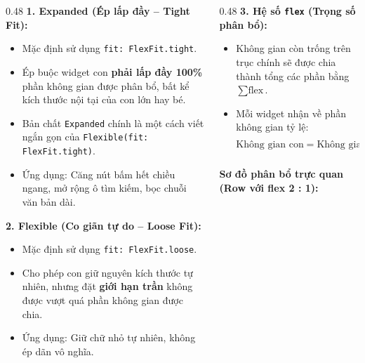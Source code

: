 \documentclass[aspectratio=169, 10pt]{beamer}
\newcommand{\SlideHeader}[2]{%
  \noindent{\textcolor{AccentOrange}{\textbf{\footnotesize #1}}}\\[0.08cm]
  \noindent{\Large \textbf{\textcolor{NavyTitle}{#2}}}\\[0.22cm]
}
\begin{document}
\begin{frame}
  \SlideHeader{CƠ SỞ LÝ THUYẾT}{Phân Tách Không Gian: Expanded vs Flexible}

  \begin{columns}[T]
    \begin{column}{0.48\textwidth}
      \textbf{1. Expanded (Ép lấp đầy -- Tight Fit):}
      \begin{itemize}
        \item Mặc định sử dụng \texttt{fit: FlexFit.tight}.
        \item Ép buộc widget con \textbf{phải lấp đầy 100\%} phần không gian được phân bổ, bất kể kích thước nội tại của con lớn hay bé.
        \item Bản chất \texttt{Expanded} chính là một cách viết ngắn gọn của \texttt{Flexible(fit: FlexFit.tight)}.
        \item Ứng dụng: Căng nút bấm hết chiều ngang, mở rộng ô tìm kiếm, bọc chuỗi văn bản dài.
      \end{itemize}

      \vspace{0.2cm}
      \textbf{2. Flexible (Co giãn tự do -- Loose Fit):}
      \begin{itemize}
        \item Mặc định sử dụng \texttt{fit: FlexFit.loose}.
        \item Cho phép con giữ nguyên kích thước tự nhiên, nhưng đặt \textbf{giới hạn trần} không được vượt quá phần không gian được chia.
        \item Ứng dụng: Giữ chữ nhỏ tự nhiên, không ép dãn vô nghĩa.
      \end{itemize}
    \end{column}

    \begin{column}{0.48\textwidth}
      \textbf{3. Hệ số \texttt{flex} (Trọng số phân bổ):}
      \begin{itemize}
        \item Không gian còn trống trên trục chính sẽ được chia thành tổng các phần bằng $\sum \text{flex}$.
        \item Mỗi widget nhận về phần không gian tỷ lệ:
        $$\text{Không gian con} = \text{Không gian trống} \times \frac{\text{flex}_i}{\sum \text{flex}}$$
      \end{itemize}

      \vspace{0.2cm}
      \textbf{Sơ đồ phân bổ trực quan (Row với flex 2 : 1):}
\end{column}
\end{columns}
\end{frame}
\end{document}
